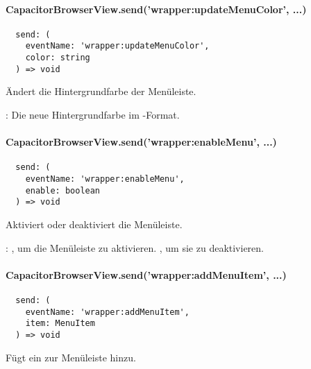 
\paragraph{CapacitorBrowserView.send('wrapper:updateMenuColor', ...)}

\begin{verbatim}
  send: (
    eventName: 'wrapper:updateMenuColor',
    color: string
  ) => void
\end{verbatim}

Ändert die Hintergrundfarbe der Menüleiste.

\begin{arguments}
  \item {}: Die neue Hintergrundfarbe im -Format.
\end{arguments}


\newpage

\paragraph{CapacitorBrowserView.send('wrapper:enableMenu', ...)}

\begin{verbatim}
  send: (
    eventName: 'wrapper:enableMenu',
    enable: boolean
  ) => void
\end{verbatim}

Aktiviert oder deaktiviert die Menüleiste.

\begin{arguments}
  \item {}: , um die Menüleiste zu aktivieren. , um sie zu deaktivieren.
\end{arguments}


\paragraph{CapacitorBrowserView.send('wrapper:addMenuItem', ...)}

\begin{verbatim}
  send: (
    eventName: 'wrapper:addMenuItem',
    item: MenuItem
  ) => void
\end{verbatim}

Fügt ein  zur Menüleiste hinzu.

